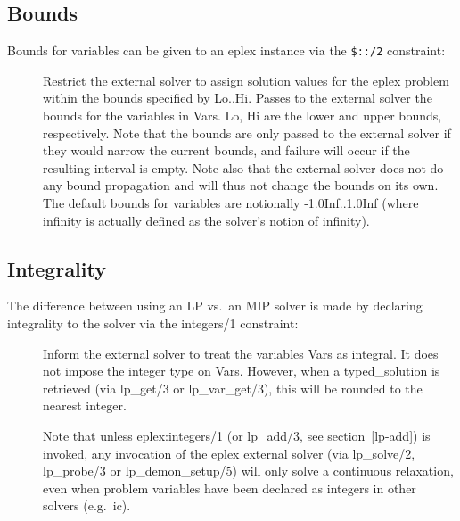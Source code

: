 \subsection{Bounds}
Bounds for variables can be given to an eplex instance via the \verb'$::/2'
constraint:
\begin{description}
    \item[]
    \label{eplex-coloncolon2}
    Restrict the external solver to assign solution values for the eplex
    problem within the bounds specified by Lo..Hi.  
    Passes to the external solver the bounds for the variables in Vars.
    Lo, Hi are the lower and upper bounds, respectively. Note that the
    bounds are only passed to the external solver if they would narrow the
    current bounds, and failure will occur if the resulting interval is empty. 
    Note also that the external solver does not do any bound propagation
    and will thus not change the bounds on its own. The default bounds for
    variables are notionally -1.0Inf..1.0Inf (where infinity is actually
    defined as the solver's notion of infinity).
\end{description}

\subsection{Integrality}
The difference between using an LP vs.\ an MIP solver is made by
declaring integrality to the solver via the integers/1 constraint:
\begin{description}
    \item[]
    \label{eplex-integers1}
	Inform the external solver to treat the variables Vars as integral.
	It does not impose the integer type on Vars. However, when a 
        typed_solution is retrieved (via lp_get/3 or
        lp_var_get/3), this will be rounded to the nearest integer.
        
        Note that unless eplex:integers/1 (or lp_add/3, see
        section~\ref{lp-add}) is invoked, any invocation
        of the eplex external solver (via lp_solve/2, lp_probe/3 or
	lp_demon_setup/5) will only solve a continuous relaxation, even
        when problem variables have been declared as integers in other
        solvers (e.g.\ ic).
        
\end{description}

